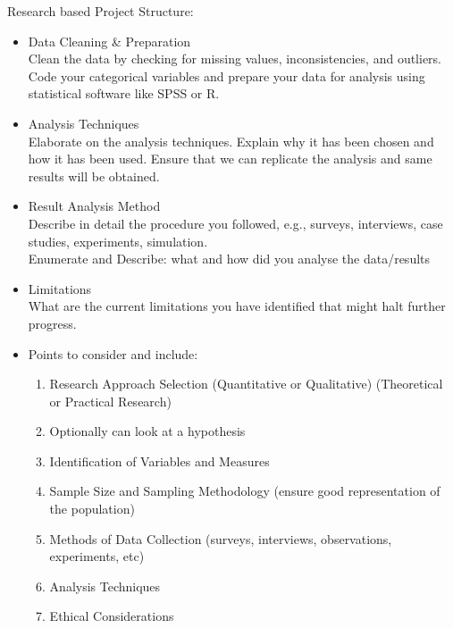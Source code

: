 Research based Project Structure:
\begin{itemize}
    \item Data Cleaning \& Preparation \\
Clean the data by checking for missing values, inconsistencies, and outliers. \\
Code your categorical variables and prepare your data for analysis using statistical software like SPSS or R.

    \item Analysis Techniques \\
Elaborate on the analysis techniques. Explain why it has been chosen and how it has been used. Ensure that we can replicate the analysis and same results will be obtained.

    \item Result Analysis Method \\
Describe in detail the procedure you followed, e.g., surveys, interviews, case studies, experiments, simulation.\\
Enumerate and Describe: what and how did you analyse the data/results

    \item Limitations \\
What are the current limitations you have identified that might halt further progress.

    \item Points to consider and include:

    \begin{enumerate}[label=(\alph*)]
        \item Research Approach Selection (Quantitative or Qualitative) (Theoretical or Practical Research)
        \item Optionally can look at a hypothesis
        \item Identification of Variables and Measures
        \item Sample Size and Sampling Methodology (ensure good representation of the population)
        \item Methods of Data Collection (surveys, interviews, observations, experiments, etc)
        \item Analysis Techniques
        \item Ethical Considerations
    \end{enumerate}
        
\end{itemize}

